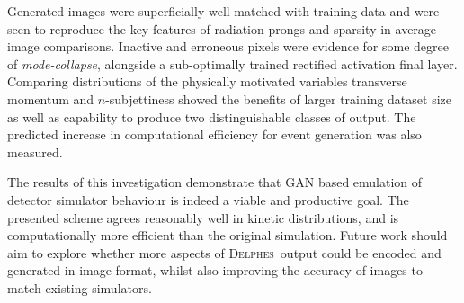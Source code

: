 \documentclass[twocolumn,twoside]{article}
\newcommand{\pkg}[1]{\textsc{#1}}
\newcommand{\delphes}{\pkg{Delphes}}
\begin{document}
Generated images were superficially well matched with training data and were seen to reproduce the key features of radiation prongs and sparsity in average image comparisons. Inactive and erroneous pixels were evidence for some degree of \textit{mode-collapse}, alongside a sub-optimally trained rectified activation final layer. Comparing distributions of the physically motivated variables transverse momentum and $n$-subjettiness showed the benefits of larger training dataset size as well as capability to produce two distinguishable classes of output. The predicted increase in computational efficiency for event generation was also measured. 

The results of this investigation demonstrate that GAN based emulation of detector simulator behaviour is indeed a viable and productive goal. The presented scheme agrees reasonably well in kinetic distributions, and is computationally more efficient than the original simulation. Future work should aim to explore whether more aspects of \delphes~output could be encoded and generated in image format, whilst also improving the accuracy of images to match existing simulators. 
\printbibliography[title=References]

\begin{appendices}

\end{appendices}
\end{document}
